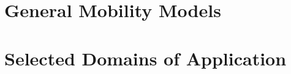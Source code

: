 \documentclass[preprint, times]{elsarticle}
\newcommand{\reviewed}[1]{{\bf Reviewed by: #1}}
\newcommand{\current}[1]{{\bf Currently working: #1}}
\newcommand{\willreview}[1]{{\bf Next: #1}}
\newcommand{\JR}{\fbox{\textsl{Jos\'e Ramasco}}}
\newcommand{\HB}{\fbox{\textsl{Hugo Barbosa}}}
\newcommand{\ML}{\fbox{\textsl{Maxime Lenormand}}}
\begin{document}
    



%

\section{General Mobility Models}
\label{sec:models}





%






\section{Selected Domains of Application}
\label{sec:applications}


%

%






%
\end{document}
